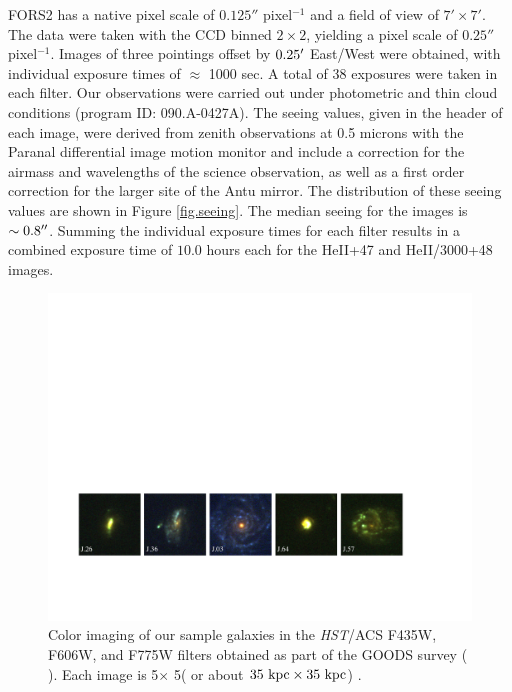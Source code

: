 \documentclass[twocolumn]{aastex61}
\begin{document}
FORS2 has a native pixel scale of $0.125''$ pixel$^{-1}$ and a field of view of $7'\times7'$.  The data were taken with 
the CCD binned $2\times2$, yielding a pixel scale of $0.25''$ pixel$^{-1}$.
Images of three pointings offset by $0.25\mbox{$^\prime$}$ East/West were obtained, with individual exposure times of $\approx$ 1000 sec.  A total of 38  exposures were taken in each filter. 
Our observations were carried out under photometric and thin cloud conditions (program ID: 090.A-0427A). 
The seeing values, given in the header of each image, were derived from zenith observations at 0.5 microns with the Paranal differential image motion monitor \citep[DIMM,][]{Sarazin1990} and include a correction for the airmass and wavelengths of the science observation, as well as a first order correction for the larger site of the Antu mirror. The distribution of these seeing values are shown in Figure \ref{fig.seeing}. The median seeing for the images is $\sim 0.8\mbox{$^{\prime\prime}$}$. Summing the individual exposure times for each filter results in a combined exposure time of $10.0$ hours each for the HeII+47 and HeII/3000+48 images.

\begin{figure}[!ht]
\centering
\includegraphics[scale=.75]{fors2_color_imstamps.pdf}
\caption{Color imaging of our sample galaxies in the \emph{HST}/ACS F435W, F606W, and F775W filters obtained as part of the GOODS survey (\citeauthor{Giavalisco2004} \citeyear{Giavalisco2004}). Each image is 5\arcsec $\times$ 5\arcsec ( or about $ 35 \rm \ kpc \times 35 \rm \ kpc $) .\label{fig:hstims}}
\end{figure}
\end{document}
